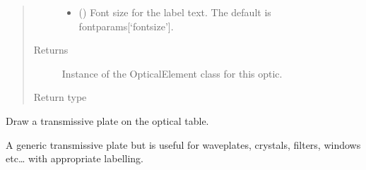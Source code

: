 \documentclass[letterpaper,10pt,english]{sphinxmanual}
\begin{document}
\begin{fulllineitems}
\begin{fulllineitems}
\begin{quote}
\begin{description}
\begin{itemize}
\item {} 
\sphinxAtStartPar
{} (\sphinxstyleliteralemphasis{\sphinxupquote{, }}) \textendash{} Font size for the label text. The default is fontparams{[}‘fontsize’{]}.

\end{itemize}

\item[{Returns}] \leavevmode
\sphinxAtStartPar
Instance of the OpticalElement class for this optic.

\item[{Return type}] \leavevmode
\sphinxAtStartPar
{\hyperref[\detokenize{index:pyopticaltable.OpticalElement}]{}}

\end{description}\end{quote}

\end{fulllineitems}


\begin{fulllineitems}
\label{\detokenize{index:pyopticaltable.OpticalTable.transmissive_plate}}
\sphinxAtStartPar
Draw a transmissive plate on the optical table.

\sphinxAtStartPar
A generic transmissive plate but is useful for waveplates, crystals,
filters, windows etc… with appropriate labelling.


\end{fulllineitems}
\end{fulllineitems}
\end{document}
